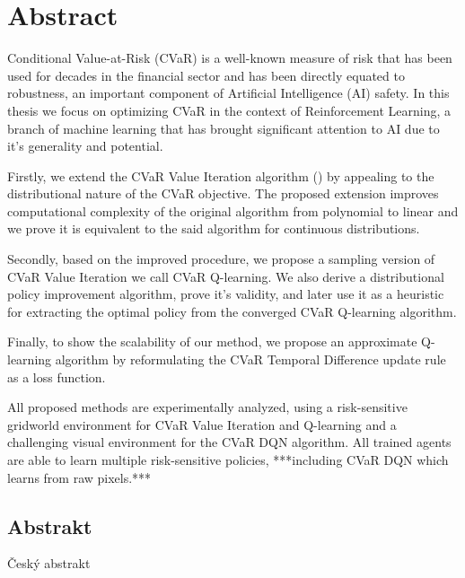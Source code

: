 \begingroup
\let\clearpage\relax
\let\cleardoublepage\relax
\let\cleardoublepage\relax

\chapter*{Abstract}


Conditional Value-at-Risk (CVaR) is a well-known measure of risk that has been used for decades in the financial sector and has been directly equated to robustness, an important component of Artificial Intelligence (AI) safety. In this thesis we focus on optimizing CVaR in the context of Reinforcement Learning, a branch of machine learning that has brought significant attention to AI due to it's generality and potential.

Firstly, we extend the CVaR Value Iteration algorithm (\citet{chow2015risk}) by appealing to the distributional nature of the CVaR objective. The proposed extension improves computational complexity of the original algorithm from polynomial to linear and we prove it is equivalent to the said algorithm for continuous distributions.

Secondly, based on the improved procedure, we propose a sampling version of CVaR Value Iteration we call CVaR Q-learning. We also derive a distributional policy improvement algorithm, prove it's validity, and later use it as a heuristic for extracting the optimal policy from the converged CVaR Q-learning algorithm.

Finally, to show the scalability of our method, we propose an approximate Q-learning algorithm by reformulating the CVaR Temporal Difference update rule as a loss function.

All proposed methods are experimentally analyzed, using a risk-sensitive gridworld environment for CVaR Value Iteration and Q-learning and a challenging visual environment for the CVaR DQN algorithm. All trained agents are able to learn multiple risk-sensitive policies, ***including CVaR DQN which learns from raw pixels.***



\vfill

\begin{otherlanguage}{czech}
\chapter*{Abstrakt}
Český abstrakt
\end{otherlanguage}

\endgroup

\vfill
